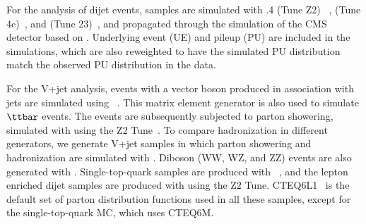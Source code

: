 For the analysis of dijet events, samples are simulated with 
\PYTHIA.4 (Tune Z2) ~\cite{pythia,Field:2010bc}, 
\PYTHIAEIGHT  (Tune 4c)~\cite{pythia8}, 
and \HERWIG (Tune 23)~\cite{herwig}, and
propagated through the simulation of the CMS
detector based on  \cite{Geant4}.
Underlying event (UE) and pileup (PU) are included in the
simulations, which are also reweighted to have the simulated
PU distribution match the observed PU distribution
in the data. 



For the V+jet analysis, events with a vector boson produced in 
association with jets are simulated using ~\cite{madgraph}. 
This matrix element generator is also used to simulate $\ttbar$ events. 
The \MADGRAPH events are subsequently subjected to parton showering, simulated 
with \PYTHIA using the Z2 Tune~\cite{Field:2010bc}. 
To compare hadronization in different generators, we generate V+jet
samples in which parton showering and hadronization are 
simulated with \HERWIG.  
Diboson (WW, WZ, and ZZ) events are also generated with \PYTHIA. 
Single-top-quark samples are produced with \POWHEG~\cite{powheg}, and the 
lepton enriched dijet samples are produced with \PYTHIA using the Z2 Tune. 
CTEQ6L1~\cite{cteq} is the default set of parton distribution
functions used 
in all these samples, except for the single-top-quark MC, which uses CTEQ6M.


 
